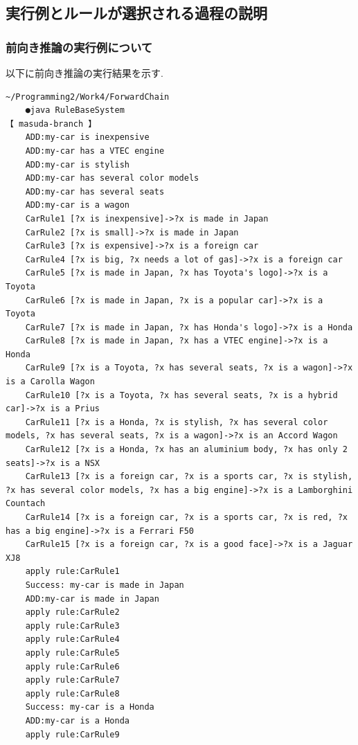 \documentclass[uplatex,12pt]{jsarticle}
\begin{document}
\subsection{実行例とルールが選択される過程の説明}
\subsubsection{前向き推論の実行例について}
以下に前向き推論の実行結果を示す.
\begin{lstlisting}[caption=前向き推論の実行結果 , label=mid]
    ~/Programming2/Work4/ForwardChain
    ●java RuleBaseSystem                                                                                                                                                                                                      【 masuda-branch 】
    ADD:my-car is inexpensive
    ADD:my-car has a VTEC engine
    ADD:my-car is stylish
    ADD:my-car has several color models
    ADD:my-car has several seats
    ADD:my-car is a wagon
    CarRule1 [?x is inexpensive]->?x is made in Japan
    CarRule2 [?x is small]->?x is made in Japan
    CarRule3 [?x is expensive]->?x is a foreign car
    CarRule4 [?x is big, ?x needs a lot of gas]->?x is a foreign car
    CarRule5 [?x is made in Japan, ?x has Toyota's logo]->?x is a Toyota
    CarRule6 [?x is made in Japan, ?x is a popular car]->?x is a Toyota
    CarRule7 [?x is made in Japan, ?x has Honda's logo]->?x is a Honda
    CarRule8 [?x is made in Japan, ?x has a VTEC engine]->?x is a Honda
    CarRule9 [?x is a Toyota, ?x has several seats, ?x is a wagon]->?x is a Carolla Wagon
    CarRule10 [?x is a Toyota, ?x has several seats, ?x is a hybrid car]->?x is a Prius
    CarRule11 [?x is a Honda, ?x is stylish, ?x has several color models, ?x has several seats, ?x is a wagon]->?x is an Accord Wagon
    CarRule12 [?x is a Honda, ?x has an aluminium body, ?x has only 2 seats]->?x is a NSX
    CarRule13 [?x is a foreign car, ?x is a sports car, ?x is stylish, ?x has several color models, ?x has a big engine]->?x is a Lamborghini Countach
    CarRule14 [?x is a foreign car, ?x is a sports car, ?x is red, ?x has a big engine]->?x is a Ferrari F50
    CarRule15 [?x is a foreign car, ?x is a good face]->?x is a Jaguar XJ8
    apply rule:CarRule1
    Success: my-car is made in Japan
    ADD:my-car is made in Japan
    apply rule:CarRule2
    apply rule:CarRule3
    apply rule:CarRule4
    apply rule:CarRule5
    apply rule:CarRule6
    apply rule:CarRule7
    apply rule:CarRule8
    Success: my-car is a Honda
    ADD:my-car is a Honda
    apply rule:CarRule9

\end{lstlisting}
\end{document}
